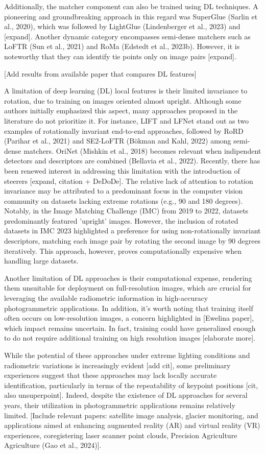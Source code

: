 Additionally, the matcher component can also be trained using DL techniques. A pioneering and groundbreaking approach in this regard was SuperGlue (Sarlin et al., 2020), which was followed by LightGlue (Lindenberger et al., 2023) and [expand]. Another dynamic category encompasses semi-dense matchers such as LoFTR (Sun et al., 2021) and RoMa (Edstedt et al., 2023b). However, it is noteworthy that they can identify tie points only on image pairs [expand]. 

[Add results from available paper that compares DL features] 

A limitation of deep learning (DL) local features is their limited invariance to rotation, due to training on images oriented almost upright. Although some authors initially emphasized this aspect, many approaches proposed in the literature do not prioritize it. For instance, LIFT and LFNet stand out as two examples of rotationally invariant end-to-end approaches, followed by RoRD (Parihar et al., 2021) and SE2-LoFTR (Bökman and Kahl, 2022) among semi-dense matchers. OriNet (Mishkin et al., 2018) becomes relevant when indipendent detectors and descriptors are combined (Bellavia et al., 2022). Recently, there has been renewed interest in addressing this limitation with the introduction of steerers [expand, citation + DeDoDe]. The relative lack of attention to rotation invariance may be attributed to a predominant focus in the computer vision community on datasets lacking extreme rotations (e.g., 90 and 180 degrees). Notably, in the Image Matching Challenge (IMC) from 2019 to 2022, datasets predominantly featured 'upright' images. However, the inclusion of rotated datasets in IMC 2023 highlighted a preference for using non-rotationally invariant descriptors, matching each image pair by rotating the second image by 90 degrees iteratively. This approach, however, proves computationally expensive when handling large datasets. 

Another limitation of DL approaches is their computational expense, rendering them unsuitable for deployment on full-resolution images, which are crucial for leveraging the available radiometric information in high-accuracy photogrammetric applications. In addition, it's worth noting that training itself often occurs on low-resolution images, a concern highlighted in [Ewelina paper], which impact remains uncertain. In fact, training could have generalized enough to do not require additional training on high resolution images [elaborate more]. 

While the potential of these approaches under extreme lighting conditions and radiometric variations is increasingly evident [add cit], some preliminary experiences suggest that these approaches may lack locally accurate identification, particularly in terms of the repeatability of keypoint positions [cit, also unsuperpoint]. 
Indeed, despite the existence of DL approaches for several years, their utilization in photogrammetric applications remains relatively limited. [Include relevant papers: satellite image analysis, glacier monitoring, and applications aimed at enhancing augmented reality (AR) and virtual reality (VR) experiences, coregistering laser scanner point clouds, Precision Agriculture Agriculture (Gao et al., 2024)]. 

